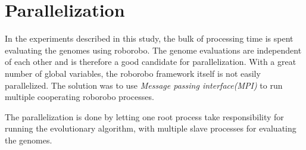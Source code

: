 \chapter{Parallelization}
In the experiments described in this study, the bulk of processing time is spent evaluating the genomes using roborobo.
The genome evaluations are independent of each other and is therefore a good candidate for parallelization.
With a great number of global variables, the roborobo framework itself is not easily parallelized.
The solution was to use \emph{Message passing interface(MPI)} to run multiple cooperating roborobo processes. 

The parallelization is done by letting one root process take responsibility for running the evolutionary algorithm, with multiple slave processes for evaluating the genomes.

